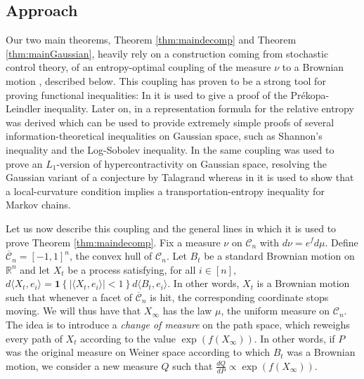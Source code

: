 \documentclass[12pt]{article}
\def \RR {\mathbb R}
\def \CC {\mathbb C}
\def \DC {\mathcal{C}_n}
\def \CC {\overline{\mathcal{C}}_n}
\theoremstyle{definition}
\theoremstyle{remark}
\begin{document}
\subsection{Approach} \label{sec:approach}
Our two main theorems, Theorem \ref{thm:maindecomp} and Theorem \ref{thm:mainGaussian}, heavily rely on a construction coming from stochastic control theory, of an entropy-optimal coupling of the measure $\nu$ to a Brownian motion \cite{Follmer85, Borell02, Lehec-13}, described below. This coupling has proven to be a strong tool for proving functional inequalities: In \cite{Borell02} it is used to give a proof of the Pr\'ekopa-Leindler inequality. Later on, in \cite{Lehec-13} a representation formula for the relative entropy was derived which can be used to provide extremely simple proofs of several information-theoretical inequalities on Gaussian space, such as Shannon's inequality and the Log-Sobolev inequality. In \cite{EL-regularization} the same coupling was used to prove an $L_1$-version of hypercontractivity on Gaussian space, resolving the Gaussian variant of a conjecture by Talagrand whereas in \cite{ELL15} it is used to show that a local-curvature condition implies a transportation-entropy inequality for Markov chains.

Let us now describe this coupling and the general lines in which it is used to prove Theorem \ref{thm:maindecomp}. Fix a measure $\nu$ on $\DC$ with $d \nu = e^f d \mu$. Define $\CC=[-1,1]^n$, the convex hull of $\DC$. Let $B_t$ be a standard Brownian motion on $\RR^n$ and let $X_t$ be a process satisfying, for all $i \in [n]$, $d \langle X_t, e_i \rangle = \mathbf{1}\left \{ |\langle X_t, e_i \rangle| < 1 \right \} d \langle B_t, e_i \rangle$. In other words, $X_t$ is a Brownian motion such that whenever a facet of $\CC$ is hit, the corresponding coordinate stops moving. We will thus have that $X_\infty$ has the law $\mu$, the uniform measure on $\DC$. The idea is to introduce a \emph{change of measure} on the path space, which reweighs every path of $X_t$ according to the value $\exp(f(X_\infty))$. In other words, if $P$ was the original measure on Weiner space according to which $B_t$ was a Brownian motion, we consider a new measure $Q$ such that $\frac{dQ}{dP} \propto \exp(f(X_\infty))$.
\end{document}
